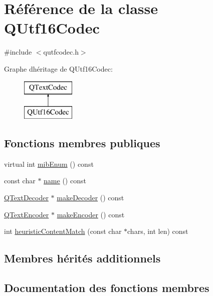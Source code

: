 \hypertarget{class_q_utf16_codec}{}\section{Référence de la classe Q\+Utf16\+Codec}
\label{class_q_utf16_codec}


{\ttfamily \#include $<$qutfcodec.\+h$>$}

Graphe d\textquotesingle{}héritage de Q\+Utf16\+Codec\+:\begin{figure}[H]
\begin{center}
\leavevmode
\includegraphics[height=2.000000cm]{class_q_utf16_codec}
\end{center}
\end{figure}
\subsection*{Fonctions membres publiques}
\begin{DoxyCompactItemize}
\item 
virtual int \hyperlink{class_q_utf16_codec_a4205f8f316bbcda8fb0c249d136841ef}{mib\+Enum} () const 
\item 
const char $\ast$ \hyperlink{class_q_utf16_codec_ae25af075f8537a0c3ebb287628ac4a40}{name} () const 
\item 
\hyperlink{class_q_text_decoder}{Q\+Text\+Decoder} $\ast$ \hyperlink{class_q_utf16_codec_a7858626a6526af5827e6232ef6966bb9}{make\+Decoder} () const 
\item 
\hyperlink{class_q_text_encoder}{Q\+Text\+Encoder} $\ast$ \hyperlink{class_q_utf16_codec_ae68418fe67a8d93760ea0e45620ed4b9}{make\+Encoder} () const 
\item 
int \hyperlink{class_q_utf16_codec_a767b70542f9e532883ad4c79fcad853b}{heuristic\+Content\+Match} (const char $\ast$chars, int len) const 
\end{DoxyCompactItemize}
\subsection*{Membres hérités additionnels}


\subsection{Documentation des fonctions membres}
\hypertarget{class_q_utf16_codec_a767b70542f9e532883ad4c79fcad853b}{}

